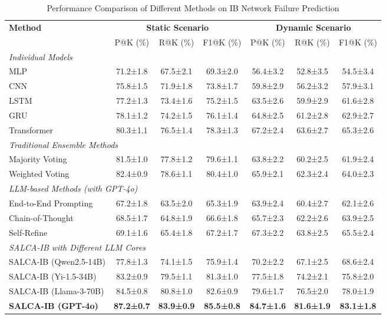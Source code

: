 \documentclass[conference]{IEEEtran}
\begin{document}
\begin{table}[!t]
\caption{Performance Comparison of Different Methods on IB Network Failure Prediction}
\label{tab:main_results}
\renewcommand{\arraystretch}{1.2}
\centering
\begin{tabular}{l|ccc|ccc}
\hline\hline
\multirow{2}{*}{\textbf{Method}} & \multicolumn{3}{c|}{\textbf{Static Scenario}} & \multicolumn{3}{c}{\textbf{Dynamic Scenario}} \\
\cline{2-7}
& P@K (\%) & R@K (\%) & F1@K (\%) & P@K (\%) & R@K (\%) & F1@K (\%) \\
\hline
\multicolumn{7}{l}{\textit{Individual Models}} \\
\hline
MLP & 71.2±1.8 & 67.5±2.1 & 69.3±2.0 & 56.4±3.2 & 52.8±3.5 & 54.5±3.4 \\
CNN & 75.8±1.5 & 71.9±1.8 & 73.8±1.7 & 59.8±2.9 & 56.2±3.2 & 57.9±3.1 \\
LSTM & 77.2±1.3 & 73.4±1.6 & 75.2±1.5 & 63.5±2.6 & 59.9±2.9 & 61.6±2.8 \\
GRU & 78.1±1.2 & 74.2±1.5 & 76.1±1.4 & 64.8±2.5 & 61.2±2.8 & 62.9±2.7 \\
Transformer & 80.3±1.1 & 76.5±1.4 & 78.3±1.3 & 67.2±2.4 & 63.6±2.7 & 65.3±2.6 \\
\hline
\multicolumn{7}{l}{\textit{Traditional Ensemble Methods}} \\
\hline
Majority Voting & 81.5±1.0 & 77.8±1.2 & 79.6±1.1 & 63.8±2.2 & 60.2±2.5 & 61.9±2.4 \\
Weighted Voting & 82.4±0.9 & 78.6±1.1 & 80.4±1.0 & 65.9±2.1 & 62.3±2.4 & 64.0±2.3 \\
\hline
\multicolumn{7}{l}{\textit{LLM-based Methods (with GPT-4o)}} \\
\hline
End-to-End Prompting & 67.2±1.8 & 63.5±2.0 & 65.3±1.9 & 63.9±2.4 & 60.4±2.7 & 62.1±2.6 \\
Chain-of-Thought & 68.5±1.7 & 64.8±1.9 & 66.6±1.8 & 65.7±2.3 & 62.2±2.6 & 63.9±2.5 \\
Self-Refine & 69.1±1.6 & 65.4±1.8 & 67.2±1.7 & 67.3±2.2 & 63.8±2.5 & 65.5±2.4 \\
\hline
\multicolumn{7}{l}{\textit{SALCA-IB with Different LLM Cores}} \\
\hline
SALCA-IB (Qwen2.5-14B) & 77.8±1.3 & 74.1±1.5 & 75.9±1.4 & 70.2±2.2 & 67.1±2.5 & 68.6±2.4 \\
SALCA-IB (Yi-1.5-34B) & 83.2±0.9 & 79.5±1.1 & 81.3±1.0 & 77.5±1.8 & 74.2±2.1 & 75.8±2.0 \\
SALCA-IB (Llama-3-70B) & 84.5±0.8 & 80.8±1.0 & 82.6±0.9 & 79.6±1.7 & 76.5±2.0 & 78.0±1.9 \\
\textbf{SALCA-IB (GPT-4o)} & \textbf{87.2±0.7} & \textbf{83.9±0.9} & \textbf{85.5±0.8} & \textbf{84.7±1.6} & \textbf{81.6±1.9} & \textbf{83.1±1.8} \\

\hline\hline
\end{tabular}
\end{table}
\end{document}
